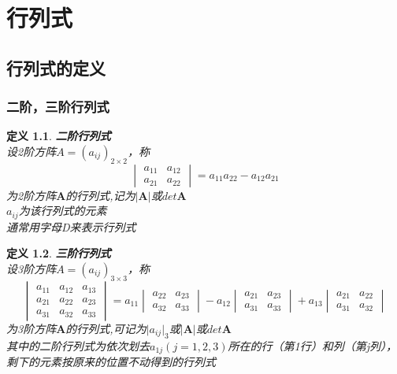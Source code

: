 \documentclass[a4paper]{ctexbook}
\newtheorem{definition}{定义}[section]
\begin{document}
\part{行列式}
\chapter{行列式的定义}
\section{二阶，三阶行列式}
\begin{definition}
    \textbf{二阶行列式}
    \\设2阶方阵\(A=(a_{ij})_{2\times 2}\)，称
    \[\begin{vmatrix}
        a_{11}&a_{12}
        \\a_{21}&a_{22}
    \end{vmatrix}=a_{11}a_{22}-a_{12}a_{21}\]
    为2阶方阵\(\mathbf{A}\)的行列式,记为\(\rvert\mathbf{A}\rvert\)或\(det{\mathbf{A}}\)
    \\ \(a_{ij}\)为该行列式的元素
    \\通常用字母D来表示行列式
\end{definition}
\begin{definition}
    \textbf{三阶行列式}
    \\设3阶方阵\(A=(a_{ij})_{3\times 3}\)，称
    \[\begin{vmatrix}
        a_{11}&a_{12}&a_{13}
        \\a_{21}&a_{22}&a_{23}
        \\a_{31}&a_{32}&a_{33}
    \end{vmatrix}=a_{11}
    \begin{vmatrix}
        a_{22}&a_{23}
        \\a_{32}&a_{33}
    \end{vmatrix}-a_{12}
    \begin{vmatrix}
        a_{21}&a_{23}
        \\a_{31}&a_{33}
    \end{vmatrix}+a_{13}
    \begin{vmatrix}
        a_{21}&a_{22}
        \\a_{31}&a_{32}
    \end{vmatrix}\]
    为3阶方阵\(\mathbf{A}\)的行列式,可记为\(\rvert{a_{ij}}\rvert_3\)或\(\rvert\mathbf{A}\rvert\)或\(det{\mathbf{A}}\)
    \\其中的二阶行列式为依次划去\(a_{1j} (j=1,2,3)\)所在的行（第1行）和列（第j列），剩下的元素按原来的位置不动得到的行列式
\end{definition}
\end{document}
